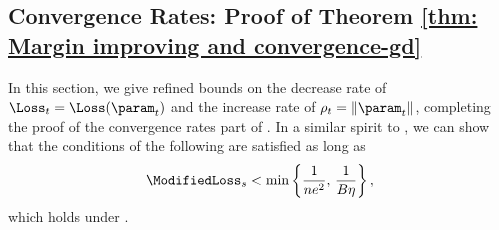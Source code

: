


\subsection{Convergence Rates: Proof of Theorem \ref{thm: Margin improving and convergence-gd}}\label{sec:converge_rate_gd}
In this section, we give refined bounds on the decrease rate of $\Loss_t = \Loss (\param_t )$ and the increase rate of $\rho_t = \| \param_t \|$, completing the proof of the convergence rates part of . In a similar spirit to , we can show that the conditions of the following  are satisfied as long as
\begin{equation*}
    \ModifiedLoss_s < \min \left\{ \frac{1}{n e^2}, \, \frac{1}{B \eta} \right\},
\end{equation*}
which holds under . 


